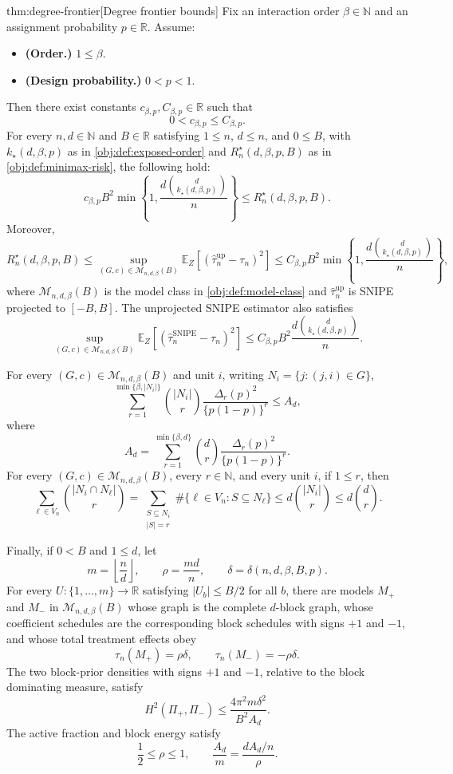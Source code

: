 \begin{theoremv}{thm:degree-frontier}[Degree frontier bounds]
Fix an interaction order \(\beta\in\mathbb N\) and an assignment probability \(p\in\mathbb R\). Assume:
\begin{itemize}
\item \textbf{(Order.)} \(1\le \beta\).
\item \textbf{(Design probability.)} \(0<p<1\).
\end{itemize}
Then there exist constants \(c_{\beta,p},C_{\beta,p}\in\mathbb R\) such that
\[
0<c_{\beta,p}\le C_{\beta,p}.
\]
For every \(n,d\in\mathbb N\) and \(B\in\mathbb R\) satisfying \(1\le n\), \(d\le n\), and \(0\le B\), with \(k_\star(d,\beta,p)\) as in \cref{obj:def:exposed-order} and \(R_n^\star(d,\beta,p,B)\) as in \cref{obj:def:minimax-risk}, the following hold:
\[
c_{\beta,p}B^2
\min\!\left\{1,\frac{d\binom{d}{k_\star(d,\beta,p)}}{n}\right\}
\le
R_n^\star(d,\beta,p,B).
\]
Moreover,
\[
R_n^\star(d,\beta,p,B)
\le
\sup_{(G,c)\in\mathcal M_{n,d,\beta}(B)}
\mathbb E_Z\!\left[
\left(\widehat\tau_n^{\mathrm{up}}-\tau_n\right)^2
\right]
\le
C_{\beta,p}B^2
\min\!\left\{1,\frac{d\binom{d}{k_\star(d,\beta,p)}}{n}\right\},
\]
where \(\mathcal M_{n,d,\beta}(B)\) is the model class in \cref{obj:def:model-class} and \(\widehat\tau_n^{\mathrm{up}}\) is SNIPE projected to \([-B,B]\). The unprojected SNIPE estimator also satisfies
\[
\sup_{(G,c)\in\mathcal M_{n,d,\beta}(B)}
\mathbb E_Z\!\left[
\left(\widehat\tau_n^{\mathrm{SNIPE}}-\tau_n\right)^2
\right]
\le
C_{\beta,p}B^2
\frac{d\binom{d}{k_\star(d,\beta,p)}}{n}.
\]

For every \((G,c)\in\mathcal M_{n,d,\beta}(B)\) and unit \(i\), writing \(N_i=\{j:(j,i)\in G\}\),
\[
\sum_{r=1}^{\min\{\beta,|N_i|\}}
\binom{|N_i|}{r}
\frac{\Delta_r(p)^2}{\{p(1-p)\}^r}
\le
A_d,
\]
where
\[
A_d
=
\sum_{r=1}^{\min\{\beta,d\}}
\binom{d}{r}
\frac{\Delta_r(p)^2}{\{p(1-p)\}^r}.
\]
For every \((G,c)\in\mathcal M_{n,d,\beta}(B)\), every \(r\in\mathbb N\), and every unit \(i\), if \(1\le r\), then
\[
\sum_{\ell\in V_n}
\binom{|N_i\cap N_\ell|}{r}
=
\sum_{\substack{S\subseteq N_i\\ |S|=r}}
\#\{\ell\in V_n:S\subseteq N_\ell\}
\le
d\binom{|N_i|}{r}
\le
d\binom{d}{r}.
\]

Finally, if \(0<B\) and \(1\le d\), let
\[
m=\left\lfloor\frac{n}{d}\right\rfloor,
\qquad
\rho=\frac{md}{n},
\qquad
\delta=\delta(n,d,\beta,B,p).
\]
For every \(U:\{1,\ldots,m\}\to\mathbb R\) satisfying \(|U_b|\le B/2\) for all \(b\), there are models \(M_+\) and \(M_-\) in \(\mathcal M_{n,d,\beta}(B)\) whose graph is the complete \(d\)-block graph, whose coefficient schedules are the corresponding block schedules with signs \(+1\) and \(-1\), and whose total treatment effects obey
\[
\tau_n(M_+)=\rho\delta,
\qquad
\tau_n(M_-)=-\rho\delta.
\]
The two block-prior densities with signs \(+1\) and \(-1\), relative to the block dominating measure, satisfy
\[
H^2(\Pi_+,\Pi_-)
\le
\frac{4\pi^2m\delta^2}{B^2A_d}.
\]
The active fraction and block energy satisfy
\[
\frac12\le \rho\le 1,
\qquad
\frac{A_d}{m}
=
\frac{dA_d/n}{\rho}.
\]
\end{theoremv}

